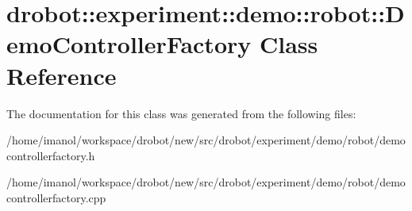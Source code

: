 \hypertarget{classdrobot_1_1experiment_1_1demo_1_1robot_1_1DemoControllerFactory}{\section{drobot\-:\-:experiment\-:\-:demo\-:\-:robot\-:\-:Demo\-Controller\-Factory Class Reference}
\label{classdrobot_1_1experiment_1_1demo_1_1robot_1_1DemoControllerFactory}
}


The documentation for this class was generated from the following files\-:\begin{DoxyCompactItemize}
\item 
/home/imanol/workspace/drobot/new/src/drobot/experiment/demo/robot/democontrollerfactory.\-h\item 
/home/imanol/workspace/drobot/new/src/drobot/experiment/demo/robot/democontrollerfactory.\-cpp\end{DoxyCompactItemize}
